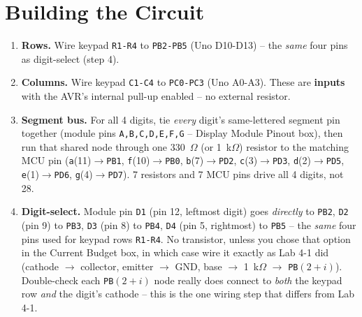 \documentclass[11pt]{article}
\begin{document}
\section*{Building the Circuit}
\begin{enumerate}[leftmargin=*,nosep]
  \item \textbf{Rows.} Wire keypad \texttt{R1-R4} to \texttt{PB2-PB5} (Uno
        D10-D13) -- the \emph{same} four pins as digit-select (step 4).
  \item \textbf{Columns.} Wire keypad \texttt{C1-C4} to \texttt{PC0-PC3} (Uno
        A0-A3). These are \textbf{inputs} with the AVR's internal pull-up enabled
        -- no external resistor.
  \item \textbf{Segment bus.} For all 4 digits, tie \emph{every} digit's
        same-lettered segment pin together (module pins \texttt{A,B,C,D,E,F,G} --
        Display Module Pinout box), then run that shared node through one
        330~$\Omega$ (or 1~k$\Omega$) resistor to the matching MCU pin
        (\texttt{a}(11)$\to$\texttt{PB1}, \texttt{f}(10)$\to$\texttt{PB0},
        \texttt{b}(7)$\to$\texttt{PD2}, \texttt{c}(3)$\to$\texttt{PD3},
        \texttt{d}(2)$\to$\texttt{PD5}, \texttt{e}(1)$\to$\texttt{PD6},
        \texttt{g}(4)$\to$\texttt{PD7}). 7 resistors and 7 MCU pins drive all 4
        digits, not 28.
  \item \textbf{Digit-select.} Module pin \texttt{D1} (pin 12, leftmost digit)
        goes \emph{directly} to \texttt{PB2}, \texttt{D2} (pin 9) to
        \texttt{PB3}, \texttt{D3} (pin 8) to \texttt{PB4}, \texttt{D4} (pin 5,
        rightmost) to \texttt{PB5} -- the \emph{same} four pins used for keypad
        rows \texttt{R1-R4}. No transistor, unless you chose that option in the
        Current Budget box, in which case wire it exactly as Lab 4-1 did
        (cathode $\to$ collector, emitter $\to$ GND, base $\to$ 1~k$\Omega$
        $\to$ \texttt{PB}$(2{+}i)$).
        Double-check each \texttt{PB}$(2{+}i)$ node really does connect to
        \emph{both} the keypad row \emph{and} the digit's cathode -- this is
        the one wiring step that differs from Lab 4-1.
\end{enumerate}
\end{document}
